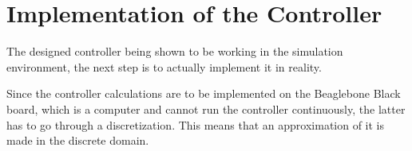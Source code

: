 \section{Implementation of the Controller}\label{impController}
The designed controller being shown to be working in the simulation environment, the next step is to actually implement it in reality.

Since the controller calculations are to be implemented on the Beaglebone Black board, which is a computer and cannot run the controller continuously, the latter has to go through a discretization. This means that an approximation of it is made in the discrete domain.
